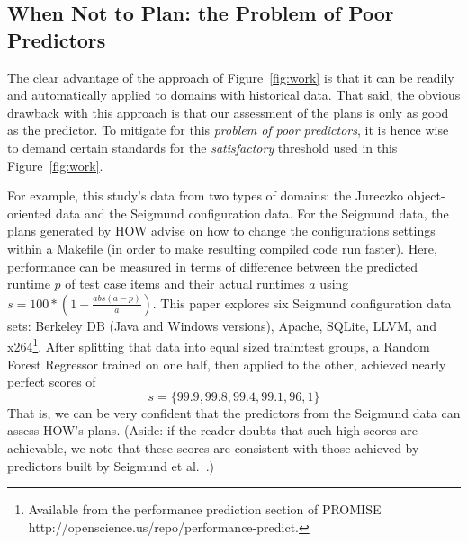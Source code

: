 \documentclass[conference]{IEEEtran}
\newcommand{\fig}[1]{Figure~\ref{fig:#1}}
\begin{document}
\subsection{When Not to Plan: the Problem of Poor Predictors}

The clear advantage of the approach of \fig{work} is that it can be readily and automatically
applied to domains with historical data. That said, the obvious drawback with this approach
is that our assessment of the plans is only as good as the predictor. To 
mitigate for this {\em problem of poor predictors}, it is hence wise to demand certain standards for the {\em
satisfactory} threshold used in this \fig{work}. 
 

For example, this study's data from two types of domains: the Jureczko   object-oriented data  
and the Seigmund configuration data. 
For the Seigmund data, the plans generated by HOW advise on how  to change the   configurations settings within a Makefile
(in order to make resulting compiled
code  run faster). Here, performance can be measured in terms of  difference
between the predicted runtime $p$ of test case items and their actual runtimes $a$
using  $s= 100*(1- \frac{abs(a - p)}{a})$.
This paper  explores    six Seigmund configuration data sets:  Berkeley DB (Java and Windows versions), Apache, SQLite, LLVM, and
  x264\footnote{Available from the performance prediction section of PROMISE
  http://openscience.us/repo/performance-predict.}. 
  After splitting that data into equal sized train:test groups, a Random Forest
  Regressor trained on one half, then applied to the other, achieved nearly perfect scores of
\[s=\{99.9, 99.8, 99.4, 99.1, 96,1\}\]
That is, we can be very confident that the predictors from the Seigmund data can assess
HOW's plans.
(Aside: if the reader doubts that such high scores are achievable, we note that these scores are 
consistent with those achieved by predictors built by Seigmund et al.~\cite{sven12}.)
\end{document}
